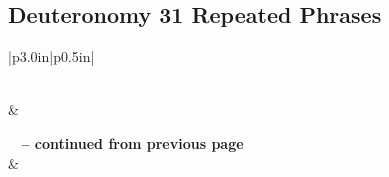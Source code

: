 \subsection{Deuteronomy 31 Repeated Phrases}


\normalsize
 
\begin{center}
\begin{longtable}{|p{3.0in}|p{0.5in}|}
\caption[Deuteronomy 31 Repeated Phrases]{Deuteronomy 31 Repeated Phrases}\label{table:Repeated Phrases Deuteronomy 31} \\
\hline {} &  \\ \hline 
\endfirsthead
 
{{\bfseries \tablename\ \thetable{} -- continued from previous page}} \\  
\hline {} &  \\ \hline 
\endhead
 

\end{longtable}
\end{center}
